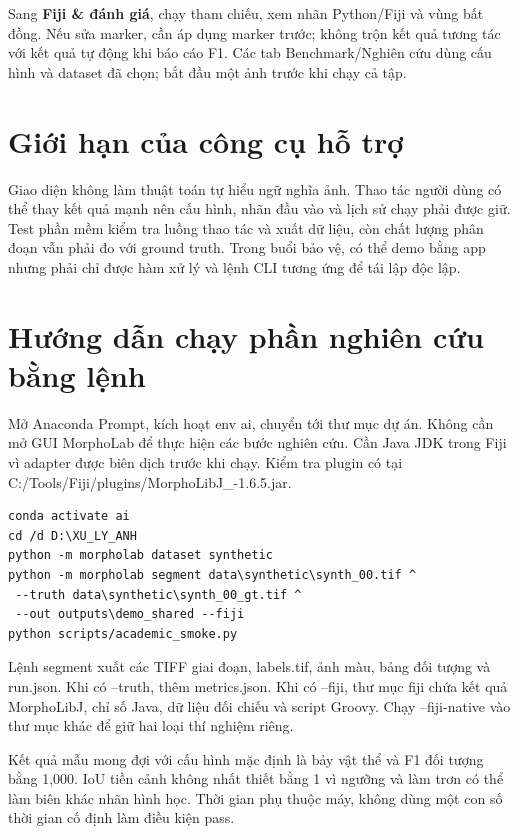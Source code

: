 \documentclass[12pt,a4paper,oneside]{report}
\begin{document}
Sang \textbf{Fiji \& đánh giá}, chạy tham chiếu, xem nhãn Python/Fiji và vùng bất đồng. Nếu sửa marker, cần áp dụng marker trước; không trộn kết quả tương tác với kết quả tự động khi báo cáo F1. Các tab Benchmark/Nghiên cứu dùng cấu hình và dataset đã chọn; bắt đầu một ảnh trước khi chạy cả tập.

\section{Giới hạn của công cụ hỗ trợ}
Giao diện không làm thuật toán tự hiểu ngữ nghĩa ảnh. Thao tác người dùng có thể thay kết quả mạnh nên cấu hình, nhãn đầu vào và lịch sử chạy phải được giữ. Test phần mềm kiểm tra luồng thao tác và xuất dữ liệu, còn chất lượng phân đoạn vẫn phải đo với ground truth. Trong buổi bảo vệ, có thể demo bằng app nhưng phải chỉ được hàm xử lý và lệnh CLI tương ứng để tái lập độc lập.

\section{Hướng dẫn chạy phần nghiên cứu bằng lệnh}
Mở Anaconda Prompt, kích hoạt env ai, chuyển tới thư mục dự án. Không cần mở GUI MorphoLab để thực hiện các bước nghiên cứu. Cần Java JDK trong Fiji vì adapter được biên dịch trước khi chạy. Kiểm tra plugin có tại C:/Tools/Fiji/plugins/MorphoLibJ\_-1.6.5.jar.



\par\medskip\noindent\begin{minipage}[t]{\linewidth}
\begin{lstlisting}[language={},numbers=none]
conda activate ai
cd /d D:\XU_LY_ANH
python -m morpholab dataset synthetic
python -m morpholab segment data\synthetic\synth_00.tif ^
 --truth data\synthetic\synth_00_gt.tif ^
 --out outputs\demo_shared --fiji
python scripts/academic_smoke.py
\end{lstlisting}\end{minipage}\par\medskip



Lệnh segment xuất các TIFF giai đoạn, labels.tif, ảnh màu, bảng đối tượng và run.json. Khi có --truth, thêm metrics.json. Khi có --fiji, thư mục fiji chứa kết quả MorphoLibJ, chỉ số Java, dữ liệu đối chiếu và script Groovy. Chạy --fiji-native vào thư mục khác để giữ hai loại thí nghiệm riêng.

Kết quả mẫu mong đợi với cấu hình mặc định là bảy vật thể và F1 đối tượng bằng 1,000. IoU tiền cảnh không nhất thiết bằng 1 vì ngưỡng và làm trơn có thể làm biên khác nhãn hình học. Thời gian phụ thuộc máy, không dùng một con số thời gian cố định làm điều kiện pass.
\end{document}
